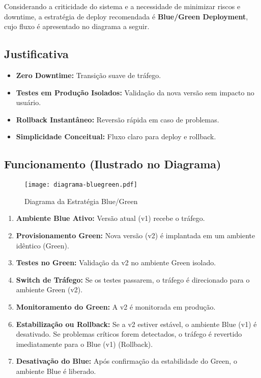 Considerando a criticidade do sistema e a necessidade de minimizar riscos e downtime, a estratégia de deploy recomendada é \textbf{Blue/Green Deployment}, cujo fluxo é apresentado no diagrama a seguir.

\subsection{Justificativa}
\label{subsec:deploy-justificativa}
\begin{itemize}
    \item \textbf{Zero Downtime:} Transição suave de tráfego.
    \item \textbf{Testes em Produção Isolados:} Validação da nova versão sem impacto no usuário.
    \item \textbf{Rollback Instantâneo:} Reversão rápida em caso de problemas.
    \item \textbf{Simplicidade Conceitual:} Fluxo claro para deploy e rollback.
\end{itemize}

\subsection{Funcionamento (Ilustrado no Diagrama)}
\label{subsec:deploy-funcionamento}

\begin{figure}[htbp]
    \centering
    \texttt{[image: diagrama-bluegreen.pdf]}
    \caption{Diagrama da Estratégia Blue/Green}
    \label{fig:diagrama-bluegreen}
\end{figure}

\begin{enumerate}
    \item \textbf{Ambiente Blue Ativo:} Versão atual (v1) recebe o tráfego.
    \item \textbf{Provisionamento Green:} Nova versão (v2) é implantada em um ambiente idêntico (Green).
    \item \textbf{Testes no Green:} Validação da v2 no ambiente Green isolado.
    \item \textbf{Switch de Tráfego:} Se os testes passarem, o tráfego é direcionado para o ambiente Green (v2).
    \item \textbf{Monitoramento do Green:} A v2 é monitorada em produção.
    \item \textbf{Estabilização ou Rollback:} Se a v2 estiver estável, o ambiente Blue (v1) é desativado. Se problemas críticos forem detectados, o tráfego é revertido imediatamente para o Blue (v1) (Rollback).
    \item \textbf{Desativação do Blue:} Após confirmação da estabilidade do Green, o ambiente Blue é liberado.
\end{enumerate}

